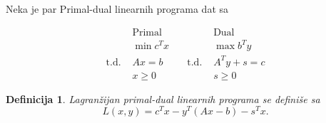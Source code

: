 \documentclass[b5paper, utf8, 11pt, colorlinks]{book}
\newtheorem{definition}{Definicija}[chapter]
\theoremstyle{definition}
\begin{document}
Neka je par Primal-dual linearnih programa dat sa

$$ \begin{array}{llll}
	&\mbox{Primal}            &\quad &\mbox{Dual}     \\
	&\min  c^T x              &\quad &\max  b^T y \\
	\mbox{t.d.\ }	&  Ax = b      &\quad \mbox{t.d.\ } &   A^Ty + s = c \\
	& x \geq 0                &\quad &  s \geq 0
\end{array}
$$


\begin{definition}
	Lagranžijan primal-dual linearnih programa se definiše sa 
	\begin{equation}
		L(x,y) = c^Tx - y^T(Ax - b) - s^T x.
	\end{equation}
\end{definition}
\end{document}

